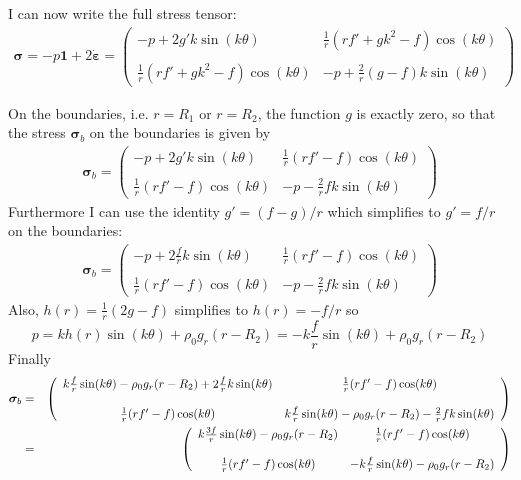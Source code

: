 I can now write the full stress tensor:
\begin{eqnarray}
{\bm \sigma} = 
- p {\bm 1} + 2 \dot{\bm \varepsilon} 
=
\left(
\begin{array}{cc}
-p + 2 g' k \sin(k\theta)  &  \frac{1}{r} (rf' + g k^2 - f) \cos(k\theta) \\ \\
\frac{1}{r} (rf' + g k^2 - f) \cos(k\theta)    &  -p + \frac{2}{r} ( g-f ) k  \sin(k\theta)
\end{array}
\right) 
\end{eqnarray}

On the boundaries, i.e. $r=R_1$ or $r=R_2$, 
the function $g$ is exactly zero, so that the stress ${\bm \sigma}_b$ 
on the boundaries is given by
\begin{eqnarray}
{\bm \sigma}_b  
=
\left(
\begin{array}{cc}
-p + 2 g' k \sin(k\theta)  &  \frac{1}{r} (rf' - f) \cos(k\theta) \\ \\
\frac{1}{r} (rf'   - f) \cos(k\theta)    &  -p - \frac{2}{r}  f  k  \sin(k\theta)
\end{array}
\right) 
\end{eqnarray}
Furthermore I can use the identity $g'=(f-g)/r$ which simplifies to $g'=f/r$ on the boundaries:
\begin{eqnarray}
{\bm \sigma}_b  
=
\left(
\begin{array}{cc}
-p + 2 \frac{f}{r} k \sin(k\theta)  &  \frac{1}{r} (rf' - f) \cos(k\theta) \\ \\
\frac{1}{r} (rf'   - f) \cos(k\theta)    &  -p - \frac{2}{r}  f  k  \sin(k\theta)
\end{array}
\right)
\end{eqnarray}
Also, $h(r)   = \frac{1}{r}(2g-f) $ simplifies to  $h(r)   = -f/r$ so 
\[
p = k h(r) \sin(k \theta) + \rho_0 g_r (r-R_2)  =
 -k \frac{f}{r} \sin(k \theta) + \rho_0 g_r (r-R_2) 
\]
Finally
\begin{eqnarray}
{\bm \sigma}_b
&=&
\left(
\begin{array}{cc}
 k \frac{f}{r} \sin(k \theta) - \rho_0 g_r (r-R_2) + 2 \frac{f}{r} k \sin(k\theta)  &  \frac{1}{r} (rf' - f) \cos(k\theta) \\ \\
\frac{1}{r} (rf'   - f) \cos(k\theta)    &    k \frac{f}{r} \sin(k \theta) - \rho_0 g_r (r-R_2)   - \frac{2}{r}  f  k  \sin(k\theta)
\end{array}
\right) \nonumber\\
&=&
\left(
\begin{array}{cc}
 k \frac{3f}{r} \sin(k \theta) - \rho_0 g_r (r-R_2)   &  \frac{1}{r} (rf' - f) \cos(k\theta) \\ \\
\frac{1}{r} (rf'   - f) \cos(k\theta)    &    - k \frac{f}{r} \sin(k \theta) - \rho_0 g_r (r-R_2)  
\end{array}
\right) \nonumber
\end{eqnarray}
